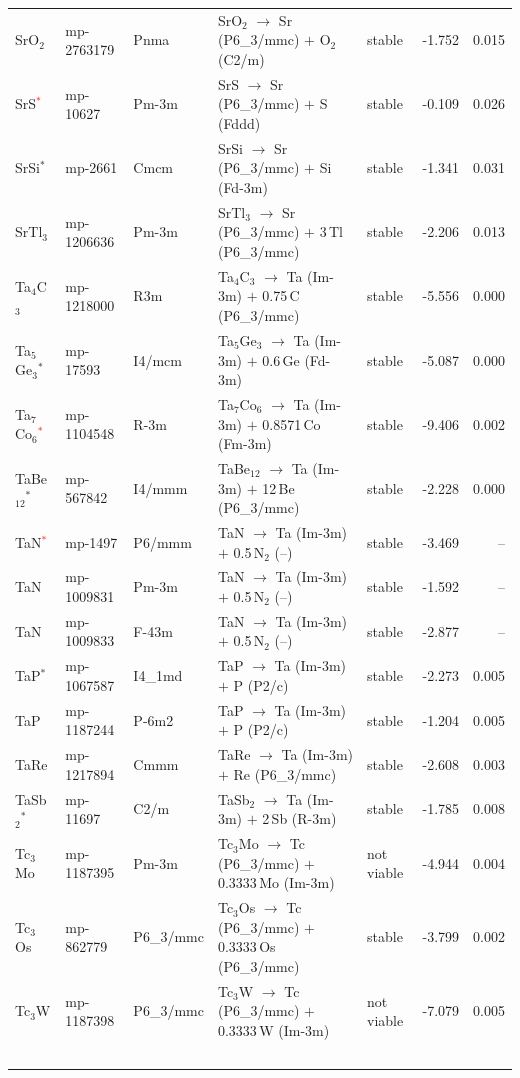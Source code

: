 \begin{longtable}{@{}ll l@{\hspace{4pt}} p{4.6cm} l@{\hspace{4pt}} rr@{}}
SrO$_{2}$ & mp-2763179 & Pnma & SrO$_{2}$ $\to$ Sr (P6\_3/mmc) $+$ O$_{2}$ (C2/m) & stable & -1.752 & 0.015 \\
SrS\textcolor{red}{$^*$} & mp-10627 & Pm-3m & SrS $\to$ Sr (P6\_3/mmc) $+$ S (Fddd) & stable & -0.109 & 0.026 \\
SrSi$^*$ & mp-2661 & Cmcm & SrSi $\to$ Sr (P6\_3/mmc) $+$ Si (Fd-3m) & stable & -1.341 & 0.031 \\
SrTl$_{3}$ & mp-1206636 & Pm-3m & SrTl$_{3}$ $\to$ Sr (P6\_3/mmc) $+$ 3\,Tl (P6\_3/mmc) & stable & -2.206 & 0.013 \\
Ta$_{4}$C$_{3}$ & mp-1218000 & R3m & Ta$_{4}$C$_{3}$ $\to$ Ta (Im-3m) $+$ 0.75\,C (P6\_3/mmc) & stable & -5.556 & 0.000 \\
Ta$_{5}$Ge$_{3}$$^*$ & mp-17593 & I4/mcm & Ta$_{5}$Ge$_{3}$ $\to$ Ta (Im-3m) $+$ 0.6\,Ge (Fd-3m) & stable & -5.087 & 0.000 \\
Ta$_{7}$Co$_{6}$\textcolor{red}{$^*$} & mp-1104548 & R-3m & Ta$_{7}$Co$_{6}$ $\to$ Ta (Im-3m) $+$ 0.8571\,Co (Fm-3m) & stable & -9.406 & 0.002 \\
TaBe$_{12}$$^*$ & mp-567842 & I4/mmm & TaBe$_{12}$ $\to$ Ta (Im-3m) $+$ 12\,Be (P6\_3/mmc) & stable & -2.228 & 0.000 \\
TaN\textcolor{red}{$^*$} & mp-1497 & P6/mmm & TaN $\to$ Ta (Im-3m) $+$ 0.5\,N$_{2}$ (--) & stable & -3.469 & -- \\
TaN & mp-1009831 & Pm-3m & TaN $\to$ Ta (Im-3m) $+$ 0.5\,N$_{2}$ (--) & stable & -1.592 & -- \\
TaN & mp-1009833 & F-43m & TaN $\to$ Ta (Im-3m) $+$ 0.5\,N$_{2}$ (--) & stable & -2.877 & -- \\
TaP$^*$ & mp-1067587 & I4\_1md & TaP $\to$ Ta (Im-3m) $+$ P (P2/c) & stable & -2.273 & 0.005 \\
TaP & mp-1187244 & P-6m2 & TaP $\to$ Ta (Im-3m) $+$ P (P2/c) & stable & -1.204 & 0.005 \\
TaRe & mp-1217894 & Cmmm & TaRe $\to$ Ta (Im-3m) $+$ Re (P6\_3/mmc) & stable & -2.608 & 0.003 \\
TaSb$_{2}$$^*$ & mp-11697 & C2/m & TaSb$_{2}$ $\to$ Ta (Im-3m) $+$ 2\,Sb (R-3m) & stable & -1.785 & 0.008 \\
Tc$_{3}$Mo & mp-1187395 & Pm-3m & Tc$_{3}$Mo $\to$ Tc (P6\_3/mmc) $+$ 0.3333\,Mo (Im-3m) & not viable & -4.944 & 0.004 \\
Tc$_{3}$Os & mp-862779 & P6\_3/mmc & Tc$_{3}$Os $\to$ Tc (P6\_3/mmc) $+$ 0.3333\,Os (P6\_3/mmc) & stable & -3.799 & 0.002 \\
Tc$_{3}$W & mp-1187398 & P6\_3/mmc & Tc$_{3}$W $\to$ Tc (P6\_3/mmc) $+$ 0.3333\,W (Im-3m) & not viable & -7.079 & 0.005 \\
$$
\end{longtable}
